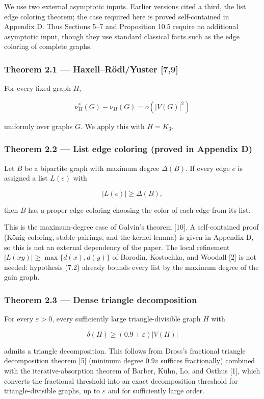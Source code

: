 \documentclass[
  11pt,
]{article}
\begin{document}
We use two external asymptotic inputs. Earlier versions cited a third, the list edge coloring theorem; the case required here is proved self-contained in Appendix D. Thus Sections 5--7 and Proposition 10.5 require no additional asymptotic input, though they use standard classical facts such as the edge coloring of complete graphs.

\subsubsection{Theorem 2.1 --- Haxell--Rödl/Yuster {[}7,9{]}}\label{theorem-2.1-haxellruxf6dlyuster-79}

For every fixed graph \(H\),

\[
\nu_H^*(G)-\nu_H(G)=o(|V(G)|^2)
\]

uniformly over graphs \(G\). We apply this with \(H=K_3\).

\subsubsection{Theorem 2.2 --- List edge coloring (proved in Appendix D)}\label{theorem-2.2-list-edge-coloring-proved-in-appendix-d}

Let \(B\) be a bipartite graph with maximum degree \(\Delta(B)\). If every edge \(e\) is assigned a list \(L(e)\) with

\[
|L(e)|\ge\Delta(B),
\]

then \(B\) has a proper edge coloring choosing the color of each edge from its list.

This is the maximum-degree case of Galvin's theorem {[}10{]}. A self-contained proof (König coloring, stable pairings, and the kernel lemma) is given in Appendix D, so this is not an external dependency of the paper. The local refinement \(|L(xy)|\ge\max\{d(x),d(y)\}\) of Borodin, Kostochka, and Woodall {[}2{]} is not needed: hypothesis (7.2) already bounds every list by the maximum degree of the gain graph.

\subsubsection{Theorem 2.3 --- Dense triangle decomposition}\label{theorem-2.3-dense-triangle-decomposition}

For every \(\varepsilon>0\), every sufficiently large triangle-divisible graph \(H\) with

\[
\delta(H)\ge(0.9+\varepsilon)|V(H)|
\]

admits a triangle decomposition. This follows from Dross's fractional triangle decomposition theorem {[}5{]} (minimum degree \(0.9v\) suffices fractionally) combined with the iterative-absorption theorem of Barber, Kühn, Lo, and Osthus {[}1{]}, which converts the fractional threshold into an exact decomposition threshold for triangle-divisible graphs, up to \(\varepsilon\) and for sufficiently large order.
\end{document}
